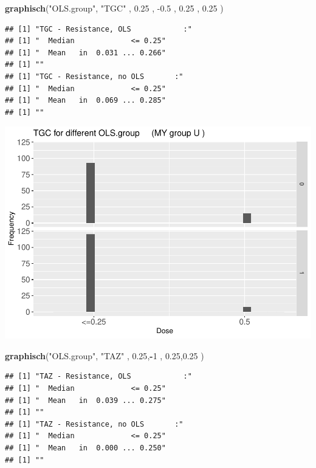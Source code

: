 \documentclass[
]{article}
\newenvironment{Shaded}{\begin{snugshade}}{\end{snugshade}}
\newcommand{\DecValTok}[1]{\textcolor[rgb]{0.00,0.00,0.81}{#1}}
\newcommand{\FloatTok}[1]{\textcolor[rgb]{0.00,0.00,0.81}{#1}}
\newcommand{\KeywordTok}[1]{\textcolor[rgb]{0.13,0.29,0.53}{\textbf{#1}}}
\newcommand{\NormalTok}[1]{#1}
\newcommand{\OperatorTok}[1]{\textcolor[rgb]{0.81,0.36,0.00}{\textbf{#1}}}
\newcommand{\StringTok}[1]{\textcolor[rgb]{0.31,0.60,0.02}{#1}}
\begin{document}
\begin{Shaded}
\begin{Highlighting}[]
  \KeywordTok{graphisch}\NormalTok{(}\StringTok{"OLS.group"}\NormalTok{, }\StringTok{"TGC"}\NormalTok{ , }\FloatTok{0.25}\NormalTok{ ,  }\FloatTok{-0.5}\NormalTok{ ,   }\FloatTok{0.25}\NormalTok{ ,   }\FloatTok{0.25}\NormalTok{ )  }
\end{Highlighting}
\end{Shaded}

\begin{verbatim}
## [1] "TGC - Resistance, OLS            :"
## [1] "  Median             <= 0.25"
## [1] "  Mean   in  0.031 ... 0.266"
## [1] ""
## [1] "TGC - Resistance, no OLS       :"
## [1] "  Median             <= 0.25"
## [1] "  Mean   in  0.069 ... 0.285"
## [1] ""
\end{verbatim}

\includegraphics{Verteilungen_files/figure-latex/unnamed-chunk-23-1.pdf}

\begin{Shaded}
\begin{Highlighting}[]
  \KeywordTok{graphisch}\NormalTok{(}\StringTok{"OLS.group"}\NormalTok{, }\StringTok{"TAZ"}\NormalTok{ , }\FloatTok{0.25}\NormalTok{,}\OperatorTok{-}\DecValTok{1}\NormalTok{   ,   }\FloatTok{0.25}\NormalTok{,}\FloatTok{0.25}\NormalTok{ )  }
\end{Highlighting}
\end{Shaded}

\begin{verbatim}
## [1] "TAZ - Resistance, OLS            :"
## [1] "  Median             <= 0.25"
## [1] "  Mean   in  0.039 ... 0.275"
## [1] ""
## [1] "TAZ - Resistance, no OLS       :"
## [1] "  Median             <= 0.25"
## [1] "  Mean   in  0.000 ... 0.250"
## [1] ""
\end{verbatim}
\end{document}
